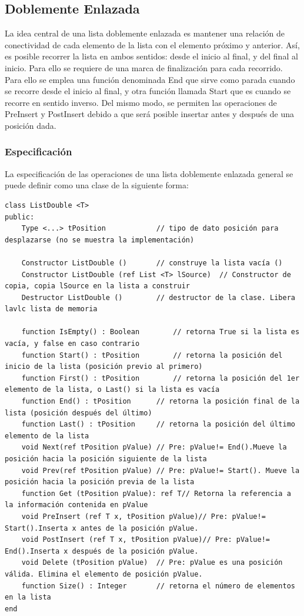 \subsection{Doblemente Enlazada} \label{lb:dobleenlazada}

La idea central de una lista doblemente enlazada es mantener una relación de conectividad de cada elemento de la lista con el elemento próximo y anterior. Así, es posible recorrer la lista en ambos sentidos: desde el inicio al final, y del final al inicio. Para ello se requiere de una marca de finalización para cada recorrido. Para ello se emplea una función denominada End que sirve como parada cuando se recorre desde el inicio al final, y otra función llamada Start que es cuando se recorre en sentido inverso. Del mismo modo, se permiten las operaciones de PreInsert y PostInsert debido a que será posible insertar antes y después de una posición dada.

\subsubsection{Especificación}

La especificación de las operaciones de una lista doblemente enlazada general se puede definir como una clase de la siguiente forma:

\begin{lstlisting}[upquote=true, language=pseudo]
class ListDouble <T>
public:
    Type <...> tPosition			// tipo de dato posición para desplazarse (no se muestra la implementación)

    Constructor ListDouble ()		// construye la lista vacía ()
    Constructor ListDouble (ref List <T> lSource)  // Constructor de copia, copia lSource en la lista a construir 
    Destructor ListDouble ()		// destructor de la clase. Libera lavlc lista de memoria

    function IsEmpty() : Boolean		// retorna True si la lista es vacía, y false en caso contrario
    function Start() : tPosition		// retorna la posición del inicio de la lista (posición previo al primero)
    function First() : tPosition		// retorna la posición del 1er elemento de la lista, o Last() si la lista es vacía
    function End() : tPosition		// retorna la posición final de la lista (posición después del último) 
    function Last() : tPosition		// retorna la posición del último elemento de la lista
    void Next(ref tPosition pValue)	// Pre: pValue!= End().Mueve la posición hacia la posición siguiente de la lista
    void Prev(ref tPosition pValue)	// Pre: pValue!= Start(). Mueve la posición hacia la posición previa de la lista
    function Get (tPosition pValue): ref T// Retorna la referencia a la información contenida en pValue
    void PreInsert (ref T x, tPosition pValue)// Pre: pValue!= Start().Inserta x antes de la posición pValue. 
    void PostInsert (ref T x, tPosition pValue)// Pre: pValue!= End().Inserta x después de la posición pValue. 
    void Delete (tPosition pValue)	// Pre: pValue es una posición válida. Elimina el elemento de posición pValue.
    function Size() : Integer		// retorna el número de elementos en la lista
end
\end{lstlisting}

